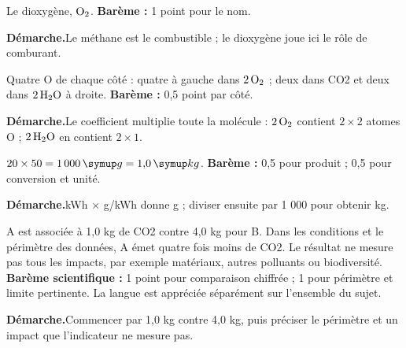 \par\noindent\begin{minipage}{\linewidth}
Le dioxygène, $\ce{O2}$. \textbf{Barème :} 1 point pour le nom.\par
\smallskip\noindent\textbf{Démarche.}\enspace Le méthane est le combustible ; le dioxygène joue ici le rôle de comburant.\par
\end{minipage}\par
\par\noindent\begin{minipage}{\linewidth}
Quatre O de chaque côté : quatre à gauche dans $2\,\ce{O2}$ ; deux dans CO2 et deux dans $2\,\ce{H2O}$ à droite. \textbf{Barème :} 0,5 point par côté.\par
\smallskip\noindent\textbf{Démarche.}\enspace Le coefficient multiplie toute la molécule : $2\,\ce{O2}$ contient $2\times2$ atomes O ; $2\,\ce{H2O}$ en contient $2\times1$.\par
{}
\end{minipage}\par
\par\noindent\begin{minipage}{\linewidth}
$20\times50=1\,000\unite g=1{,}0\unite{kg}$. \textbf{Barème :} 0,5 pour produit ; 0,5 pour conversion et unité.\par
\smallskip\noindent\textbf{Démarche.}\enspace kWh × g/kWh donne g ; diviser ensuite par 1 000 pour obtenir kg.\par
\end{minipage}\par
\par\noindent\begin{minipage}{\linewidth}
A est associée à 1,0 kg de CO2 contre 4,0 kg pour B. Dans les conditions et le périmètre des données, A émet quatre fois moins de CO2. Le résultat ne mesure pas tous les impacts, par exemple matériaux, autres polluants ou biodiversité. \textbf{Barème scientifique :} 1 point pour comparaison chiffrée ; 1 pour périmètre et limite pertinente. La langue est appréciée séparément sur l’ensemble du sujet.\par
\smallskip\noindent\textbf{Démarche.}\enspace Commencer par 1,0 kg contre 4,0 kg, puis préciser le périmètre et un impact que l’indicateur ne mesure pas.\par
\end{minipage}\par
